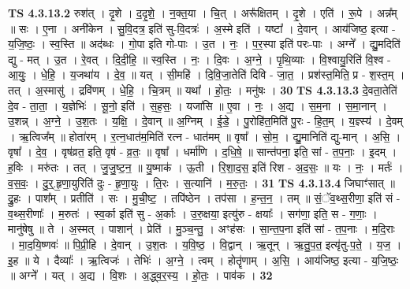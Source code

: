 \documentclass[17pt]{extarticle}
\begin{document}
                  \newline
                                \textbf{ TS 4.3.13.2} \newline
                  रुश॑त् । दृ॒शे । द॒दृ॒शे॒ । न॒क्त॒या । चि॒त् । अरू᳚क्षितम् । दृ॒शे । एति॑ । रू॒पे । अन्न᳚म् ॥ सः । ए॒ना । अनी॑केन । सु॒वि॒दत्र॒ इति॑ सु-वि॒दत्रः॑ । अ॒स्मे इति॑ । यष्टा᳚ । दे॒वान् । आय॑जिष्ठ॒ इत्या - य॒जि॒ष्ठः॒ । स्व॒स्ति ॥ अद॑ब्धः । गो॒पा इति गो-पाः । उ॒त । नः॒ । प॒र॒स्पा इति॑ परः-पाः । अग्ने᳚ । द्यु॒मदिति॑ द्यु - मत् । उ॒त । रे॒वत् । दि॒दी॒हि॒ ॥ स्व॒स्ति । नः॒ । दि॒वः । अ॒ग्ने॒ । पृ॒थि॒व्याः । वि॒श्वायु॒रिति॑ वि॒श्व - आ॒युः॒ । धे॒हि॒ । य॒जथा॑य । दे॒व॒ ॥ यत् । सी॒महि॑ । दि॒वि॒जा॒तेति॑ दिवि - जा॒त॒ । प्रश॑स्त॒मिति॒ प्र - श॒स्त॒म् । तत् । अ॒स्मासु॑ । द्रवि॑णम् । धे॒हि॒ । चि॒त्रम् ॥ यथा᳚ । हो॒तः॒ । मनु॑षः । \textbf{  30} \newline
                  \newline
                                \textbf{ TS 4.3.13.3} \newline
                  दे॒वता॒तेति॑ दे॒व - ता॒ता॒ । य॒ज्ञेभिः॑ । सू॒नो॒ इति॑ । स॒ह॒सः॒ । यजा॑सि ॥ ए॒वा । नः॒ । अ॒द्य । स॒म॒ना । स॒मा॒नान् । उ॒शन्न् । अ॒ग्ने॒ । उ॒श॒तः । य॒क्षि॒ । दे॒वान् ॥ अ॒ग्निम् । ई॒डे॒ । पु॒रोहि॑त॒मिति॑ पु॒रः - हि॒त॒म् । य॒ज्ञ्स्य॑ । दे॒वम् । ऋ॒त्विज᳚म् ॥ होता॑रम् । र॒त्न॒धात॑म॒मिति॑ रत्न - धात॑मम् ॥ वृषा᳚ । सो॒म॒ । द्यु॒मानिति॑ द्यु-मान् । अ॒सि॒ । वृषा᳚ । दे॒व॒ । वृष॑व्रत॒ इति॒ वृष॑ - व्र॒तः॒ ॥ वृषा᳚ । धर्मा॑णि । द॒धि॒षे॒ ॥ सान्त॑पना॒ इति॒ सां - त॒प॒नाः॒ । इ॒दम् । ह॒विः । मरु॑तः । तत् । जु॒जु॒ष्ट॒न॒ ॥ यु॒ष्माक॑ । ऊ॒ती । रि॒शा॒द॒स॒ इति॑ रिश - अ॒द॒सः॒ ॥ यः । नः॒ । मर्तः॑ । व॒स॒वः॒ । दु॒र्॒.हृ॒णा॒युरिति॑ दुः - हृ॒णा॒युः । ति॒रः । स॒त्यानि॑ । म॒रु॒तः॒ । \textbf{  31 } \newline
                  \newline
                                \textbf{ TS 4.3.13.4} \newline
                  जिघाꣳ॑सात् ॥ द्रु॒हः । पाश᳚म् । प्रतीति॑ । सः । मु॒ची॒ष्ट॒ । तपि॑ष्ठेन । तप॑सा । ह॒न्त॒न॒ । तम् ॥ सं॒ॅव॒थ्स॒रीणा॒ इति॑ सं - व॒थ्स॒रीणाः᳚ । म॒रुतः॑ । स्व॒र्का इति॑ सु - अ॒र्काः । उ॒रु॒क्षया॒ इत्यु॑रु - क्षयाः᳚ । सग॑णा॒ इति॒ स - ग॒णाः॒ । मानु॑षेषु ॥ ते । अ॒स्मत् । पाशान्॑ । प्रेति॑ । मु॒ञ्च॒न्तु॒ । अꣳह॑सः । सा॒न्त॒प॒ना इति॑ सां - त॒प॒नाः । म॒दि॒राः । मा॒द॒यि॒ष्णवः॑ ॥ पि॒प्री॒हि । दे॒वान् । उ॒श॒तः । य॒वि॒ष्ठ॒ । वि॒द्वान् । ऋ॒तून् । ऋ॒तु॒प॒त॒ इत्यृ॑तु-प॒ते॒ । य॒ज॒ । इ॒ह ॥ ये । दैव्याः᳚ । ऋ॒त्विजः॑ । तेभिः॑ । अ॒ग्ने॒ । त्वम् । होतॄ॑णाम् । अ॒सि॒ । आय॑जिष्ठ॒ इत्या - य॒जि॒ष्ठः॒ ॥ अग्ने᳚ । यत् । अ॒द्य । वि॒शः । अ॒द्ध्व॒र॒स्य॒ । हो॒तः॒ । पाव॑क । \textbf{  32} \newline
\end{document}
